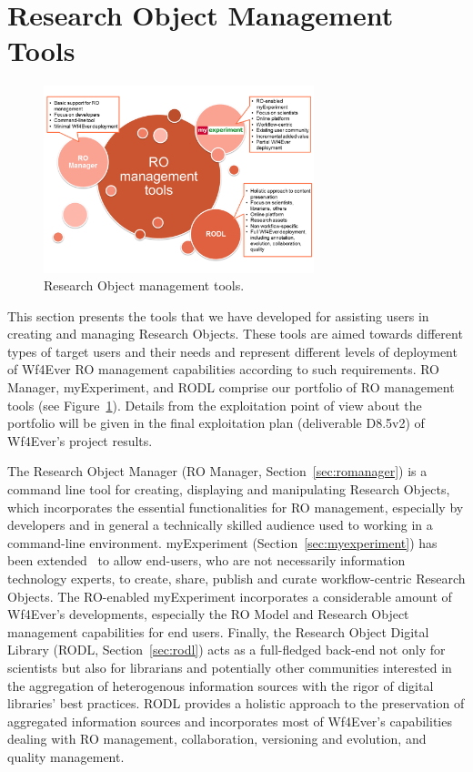 \section{Research Object Management Tools}
\label{sec:romt}

\begin{figure}
\begin{center}
\includegraphics[width=0.7\textwidth]{Figures/ROManagementTools-exploitation.png}
\end{center}
\caption{Research Object management tools.}
\label{fig:romt}
\end{figure}

This section presents the tools that we have developed for assisting users in creating and managing Research Objects. These tools are aimed towards different types of target users and their needs and represent different levels of deployment of Wf4Ever RO management capabilities according to such requirements. RO Manager, myExperiment, and RODL comprise our portfolio of RO management tools (see Figure~\ref{fig:romt}). Details from the exploitation point of view about the portfolio will be given in the final exploitation plan (deliverable D8.5v2) of Wf4Ever's project results.

The Research Object Manager (RO Manager, Section~\ref{sec:romanager}) is a command line tool for creating, displaying and manipulating Research Objects, which incorporates the essential functionalities for RO management, especially by developers and in general a technically skilled audience used to working in a command-line environment. myExperiment (Section~\ref{sec:myexperiment}) has been extended~\cite{DBLP:journals/fgcs/RoureGS09} to allow end-users, who are not necessarily information technology experts, to create, share, publish and curate workflow-centric Research Objects. The RO-enabled myExperiment incorporates a considerable amount of Wf4Ever's developments, especially the RO Model and Research Object management capabilities for end users. Finally, the Research Object Digital Library (RODL, Section~\ref{sec:rodl}) acts as a full-fledged back-end not only for scientists but also for librarians and potentially other communities interested in the aggregation of heterogenous information sources with the rigor of digital libraries' best practices. RODL provides a holistic approach to the preservation of aggregated information sources and incorporates most of Wf4Ever's capabilities dealing with RO management, collaboration, versioning and evolution, and quality management. 


